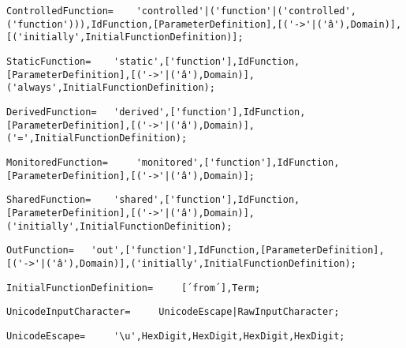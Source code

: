 \documentclass{article}
\begin{document}
    \begin{lstlisting}[mathescape=true]
     ControlledFunction= 	'controlled'|('function'|('controlled',('function'))),IdFunction,[ParameterDefinition],[('->'|('â'),Domain)],[('initially',InitialFunctionDefinition)];
    \end{lstlisting}
    
    \begin{lstlisting}[mathescape=true]
     StaticFunction= 	'static',['function'],IdFunction,[ParameterDefinition],[('->'|('â'),Domain)],('always',InitialFunctionDefinition);
    \end{lstlisting}
    
    \begin{lstlisting}[mathescape=true]
     DerivedFunction= 	'derived',['function'],IdFunction,[ParameterDefinition],[('->'|('â'),Domain)],('=',InitialFunctionDefinition);
    \end{lstlisting}
    
    \begin{lstlisting}[mathescape=true]
     MonitoredFunction= 	'monitored',['function'],IdFunction,[ParameterDefinition],[('->'|('â'),Domain)];
    \end{lstlisting}
    
    \begin{lstlisting}[mathescape=true]
     SharedFunction= 	'shared',['function'],IdFunction,[ParameterDefinition],[('->'|('â'),Domain)],('initially',InitialFunctionDefinition);
    \end{lstlisting}
    
    \begin{lstlisting}[mathescape=true]
     OutFunction= 	'out',['function'],IdFunction,[ParameterDefinition],[('->'|('â'),Domain)],('initially',InitialFunctionDefinition);
    \end{lstlisting}
    
    \begin{lstlisting}[mathescape=true]
     InitialFunctionDefinition= 	[´from´],Term;
    \end{lstlisting}
    
    \begin{lstlisting}[mathescape=true]
     UnicodeInputCharacter= 	UnicodeEscape|RawInputCharacter;
    \end{lstlisting}
    
    \begin{lstlisting}[mathescape=true]
     UnicodeEscape= 	'\u',HexDigit,HexDigit,HexDigit,HexDigit;
    \end{lstlisting}
    
\end{document}

